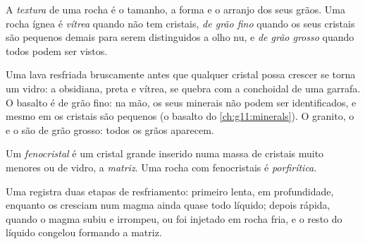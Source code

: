 \begin{definition}[Textura]\label{def:g11:igneous-rocks:texture}
A \emph{textura} de uma rocha é o tamanho, a
forma e o arranjo dos seus grãos. Uma rocha ígnea é \emph{vítrea} quando não
tem cristais, \emph{de grão fino} quando os seus cristais são pequenos demais
para serem distinguidos a olho nu, e \emph{de grão grosso} quando todos
podem ser vistos.
\end{definition}

Uma lava resfriada bruscamente antes que qualquer cristal possa crescer se
torna um vidro: a obsidiana, preta e vítrea, se quebra com a 
conchoidal de uma garrafa. O basalto é de grão fino: na mão, os seus
minerais não podem ser identificados, e mesmo em  os cristais
são pequenos (o basalto do \cref{ch:g11:minerals}). O granito, o  e o
 são de grão grosso: todos os grãos aparecem.

\begin{definition}\label{def:g11:igneous-rocks:porphyritic}
Um \emph{fenocristal} é um cristal grande inserido numa
massa de cristais muito menores ou de vidro, a \emph{matriz}. Uma rocha com
fenocristais é \emph{porfirítica}.
\end{definition}

Uma   registra duas etapas de resfriamento: primeiro lenta,
em profundidade, enquanto os  cresciam num magma ainda quase todo
líquido; depois rápida, quando o magma subiu e irrompeu, ou foi injetado em
rocha fria, e o resto do líquido congelou formando a matriz.

